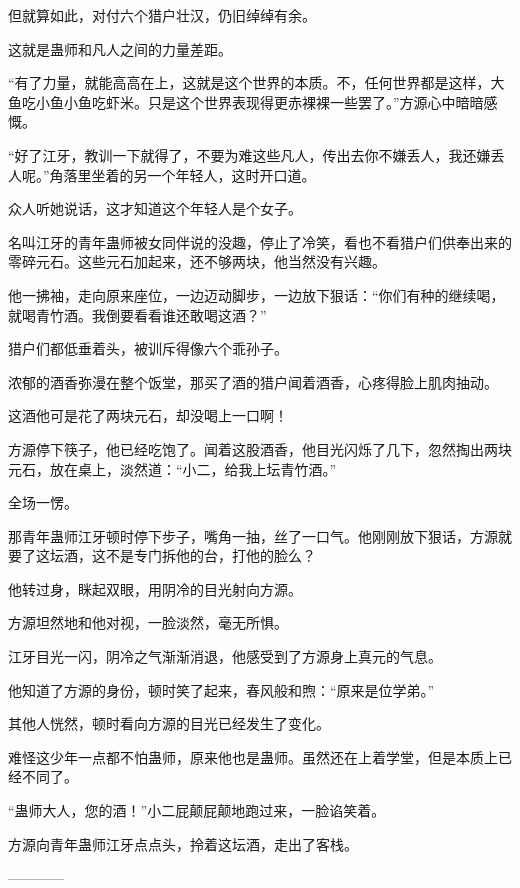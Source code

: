 \begin{this_body}
但就算如此，对付六个猎户壮汉，仍旧绰绰有余。

这就是蛊师和凡人之间的力量差距。

“有了力量，就能高高在上，这就是这个世界的本质。不，任何世界都是这样，大鱼吃小鱼小鱼吃虾米。只是这个世界表现得更赤裸裸一些罢了。”方源心中暗暗感慨。

“好了江牙，教训一下就得了，不要为难这些凡人，传出去你不嫌丢人，我还嫌丢人呢。”角落里坐着的另一个年轻人，这时开口道。

众人听她说话，这才知道这个年轻人是个女子。

名叫江牙的青年蛊师被女同伴说的没趣，停止了冷笑，看也不看猎户们供奉出来的零碎元石。这些元石加起来，还不够两块，他当然没有兴趣。

他一拂袖，走向原来座位，一边迈动脚步，一边放下狠话：“你们有种的继续喝，就喝青竹酒。我倒要看看谁还敢喝这酒？”

猎户们都低垂着头，被训斥得像六个乖孙子。

浓郁的酒香弥漫在整个饭堂，那买了酒的猎户闻着酒香，心疼得脸上肌肉抽动。

这酒他可是花了两块元石，却没喝上一口啊！

方源停下筷子，他已经吃饱了。闻着这股酒香，他目光闪烁了几下，忽然掏出两块元石，放在桌上，淡然道：“小二，给我上坛青竹酒。”

全场一愣。

那青年蛊师江牙顿时停下步子，嘴角一抽，丝了一口气。他刚刚放下狠话，方源就要了这坛酒，这不是专门拆他的台，打他的脸么？

他转过身，眯起双眼，用阴冷的目光射向方源。

方源坦然地和他对视，一脸淡然，毫无所惧。

江牙目光一闪，阴冷之气渐渐消退，他感受到了方源身上真元的气息。

他知道了方源的身份，顿时笑了起来，春风般和煦：“原来是位学弟。”

其他人恍然，顿时看向方源的目光已经发生了变化。

难怪这少年一点都不怕蛊师，原来他也是蛊师。虽然还在上着学堂，但是本质上已经不同了。

“蛊师大人，您的酒！”小二屁颠屁颠地跑过来，一脸谄笑着。

方源向青年蛊师江牙点点头，拎着这坛酒，走出了客栈。

------------

\end{this_body}

